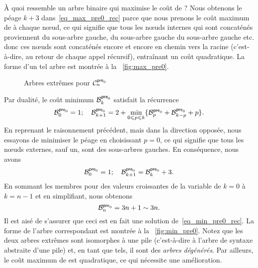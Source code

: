 À quoi ressemble un arbre binaire qui maximise le coût de
? Nous obtenons le
péage \(k+3\) dans~\eqref{eq_max_pre0_rec} parce que nous prenons le
coût maximum de  à chaque n{\oe}ud,
ce qui signifie que tous les n{\oe}uds internes qui sont concaténés
proviennent du sous-arbre gauche, du sous-arbre gauche du sous-arbre
gauche etc. donc ces n{\oe}uds sont concaténés encore et encore en
chemin vers la racine (c'est-à-dire, au retour de chaque appel
récursif), entraînant un coût quadratique. La forme d'un tel arbre est
montrée à la \fig~\vref{fig:max_pre0}.
\begin{figure}
\centering
{}
\qquad
{}
\caption{Arbres extrêmes pour \(\C{\fun{pre}_0}{n}\)
\label{fig:tree_stack}}
\end{figure}

Par dualité, le coût minimum
\(\B{\fun{pre}_0}{k}\) satisfait la
récurrence
\begin{equation*}
\B{\fun{pre}_0}{0} = 1;\quad
\B{\fun{pre}_0}{k+1} =
  2 + \min_{0 \leqslant p \leqslant k}\{\B{\fun{pre}_0}{p}
                                  + \B{\fun{pre}_0}{k-p} + p\}.
\end{equation*}
En reprenant le raisonnement précédent, mais dans la direction
opposée, nous essayons de minimiser le péage en choisissant \(p=0\),
ce qui signifie que tous les n{\oe}uds externes, sauf un, sont des
sous-arbres gauches. En conséquence, nous avons
\begin{equation}
\B{\fun{pre}_0}{0} = 1;\quad
\B{\fun{pre}_0}{k+1} = \B{\fun{pre}_0}{k} + 3.
\label{eq_min_pre0_rec}
\end{equation}
En sommant les membres pour des valeurs croissantes de la variable de
\(k=0\) à \(k=n-1\) et en simplifiant, nous obtenons
\begin{equation*}
\B{\fun{pre}_0}{n} = 3n + 1 \sim 3n.
\end{equation*}
Il est aisé de s'assurer que ceci est en fait une solution
de~\eqref{eq_min_pre0_rec}. La forme de l'arbre correspondant est
montrée à la \fig~\vref{fig:min_pre0}. Notez que les deux arbres
extrêmes sont isomorphes à une pile (c'est-à-dire à l'arbre de syntaxe
abstraite d'une pile) et, en
tant que tels, il sont des \emph{arbres dégénérés}. Par ailleurs, le coût maximum de
 est quadratique, ce
qui nécessite une amélioration.

